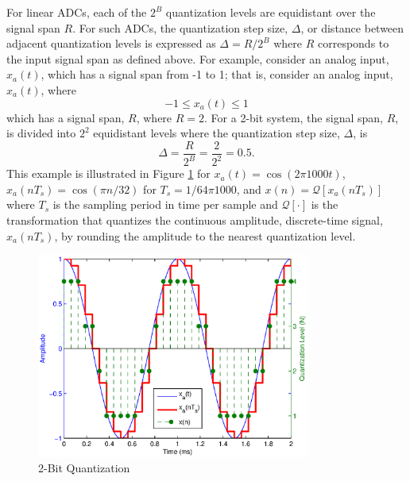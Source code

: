 \sloppy
For linear ADCs, each of the $2^B$ quantization levels are equidistant over the signal
span $R$. For such ADCs, the quantization step size, $\Delta$, or distance between
adjacent quantization levels is expressed as $\Delta=R/2^B$ where $R$ corresponds to the
input signal span as defined above. For example, consider an analog input, $x_a(t)$, which
has a signal span from -1 to 1; that is, consider an analog input, $x_a(t)$, where
$$-1\leq
x_a(t) \leq 1$$ which has a signal span, $R$, where $R=2$. For a 2-bit system, the signal
span, $R$, is divided into $2^2$ equidistant levels where the quantization step size,
$\Delta$, is $$\Delta=\frac{R}{2^B}=\frac{2}{2^2}=0.5\text{.}$$ This example is
illustrated in Figure \ref{fig:2_bit_quant} for $x_a(t)=\cos(2\pi 1000 t)$, $x_a(n
T_s)=\cos(\pi n/32)$ for $T_s=1/64\pi 1000$, and $x(n)=\mathcal{Q}\left[x_a(n
T_s)\right]$ where $T_s$ is the sampling period in time per sample and 
$\mathcal{Q}[\cdot]$ is the transformation that quantizes the continuous amplitude,
discrete-time signal, $x_a(nT_s)$, by rounding the amplitude to the nearest quantization
level.
\begin{figure}[htbp]
 \centering
 \includegraphics[width=0.8\textwidth]{./matlab_figures/2_bit_intro}
 \caption{2-Bit Quantization}
 \label{fig:2_bit_quant}
\end{figure}

